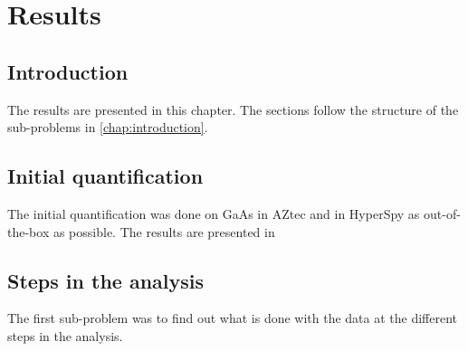 \chapter{Results}


\section{Introduction}
\label{sec:results:intro}
The results are presented in this chapter.
The sections follow the structure of the sub-problems in \cref{chap:introduction}.

\section{Initial quantification}
\label{sec:results:initial_quantification}
The initial quantification was done on GaAs in AZtec and in HyperSpy as out-of-the-box as possible. The results are presented in %





\section{Steps in the analysis}
\label{sec:results:steps}
The first sub-problem was to find out what is done with the data at the different steps in the analysis.


